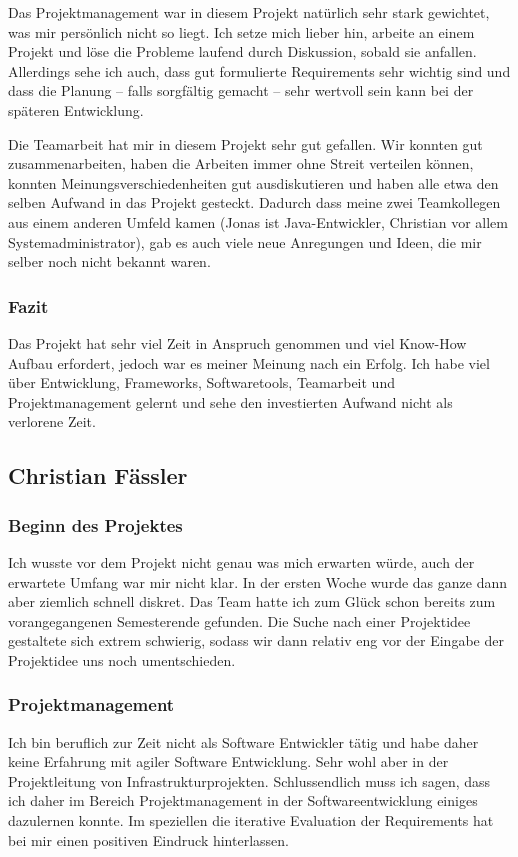 \documentclass[10pt,a4paper]{scrartcl}
\begin{document}
Das Projektmanagement war in diesem Projekt natürlich sehr stark gewichtet, was mir persönlich nicht
so liegt. Ich setze mich lieber hin, arbeite an einem Projekt und löse die Probleme laufend durch
Diskussion, sobald sie anfallen. Allerdings sehe ich auch, dass gut formulierte Requirements sehr
wichtig sind und dass die Planung -- falls sorgfältig gemacht -- sehr wertvoll sein kann bei der
späteren Entwicklung.

Die Teamarbeit hat mir in diesem Projekt sehr gut gefallen. Wir konnten gut zusammenarbeiten,
haben die Arbeiten immer ohne Streit verteilen können, konnten Meinungsverschiedenheiten gut
ausdiskutieren und haben alle etwa den selben Aufwand in das Projekt gesteckt. Dadurch dass meine
zwei Teamkollegen aus einem anderen Umfeld kamen (Jonas ist Java-Entwickler, Christian vor allem
Systemadministrator), gab es auch viele neue Anregungen und Ideen, die mir selber noch nicht bekannt
waren.

\subsubsection*{Fazit}

Das Projekt hat sehr viel Zeit in Anspruch genommen und viel Know-How Aufbau erfordert, jedoch war
es meiner Meinung nach ein Erfolg. Ich habe viel über Entwicklung, Frameworks, Softwaretools,
Teamarbeit und Projektmanagement gelernt und sehe den investierten Aufwand nicht als verlorene Zeit.


\newpage
\subsection{Christian Fässler}
\subsubsection*{Beginn des Projektes}
Ich wusste vor dem Projekt nicht genau was mich erwarten würde, auch der erwartete Umfang war mir nicht klar. In der ersten Woche wurde das ganze dann aber ziemlich schnell diskret. Das Team hatte ich zum Glück schon bereits zum vorangegangenen Semesterende gefunden. Die Suche nach einer Projektidee gestaltete sich extrem schwierig, sodass wir dann relativ eng vor der Eingabe der Projektidee uns noch umentschieden.
\subsubsection*{Projektmanagement}
Ich bin beruflich zur Zeit nicht als Software Entwickler tätig und habe daher keine Erfahrung mit agiler Software Entwicklung. Sehr wohl aber in der Projektleitung von Infrastrukturprojekten. Schlussendlich muss ich sagen, dass ich daher im Bereich Projektmanagement in der Softwareentwicklung einiges dazulernen konnte. Im speziellen die iterative Evaluation der Requirements hat bei mir einen positiven Eindruck hinterlassen.
\end{document}
